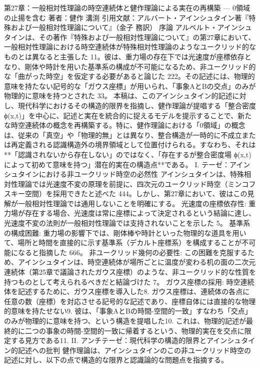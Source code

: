 \documentclass{article}
\begin{document}
第27章：一般相対性理論の時空連続体と健作理論による実在の再構築 — 0領域の止揚を含む
著者：健作 溝渕
引用文献：アルバート・アインシュタイン著『特殊および一般相対性理論について』（金子 務訳）
序論
アルベルト・アインシュタインは、その著作『特殊および一般相対性理論について』の第27章において、一般相対性理論における時空連続体が特殊相対性理論のようなユークリッド的なものとは異なると主張した 11。彼は、重力場の存在下では光速度が座標依存となり、剛体や時計を用いた基準系の構成が不可能になるため、非ユークリッド的な「曲がった時空」を仮定する必要があると論じた 222。その記述には、物理的意味を持たない記号的な「ガウス座標」が用いられ、「事象AとBの交点」のみが物理的に意味を持つとされた 33。
本稿は、このアインシュタイン的記述に対し、現代科学におけるその構造的限界を指摘し、健作理論が提唱する「整合密度 ϕ(x,t)」を中心に、記述と実在を統合的に捉えるモデルを提示することで、新たな時空連続体の概念を再構築する。特に、健作理論における「0領域」の概念は、従来の「真空」や「物理的無」とは異なり、整合構造が一時的に不成立または再定義される認識構造外の境界領域として位置付けられる。すなわち、それは**「認識されないから存在しない」のではなく、「存在するが整合密度場 ϕ(x,t) によって初めて意味を持つ」潜在的実在の構造点**である。
I. テーゼ：アインシュタインにおける非ユークリッド時空の必然性
アインシュタインは、特殊相対性理論では光速度不変の原理を前提に、四次元のユークリッド時空（ミンコフスキー空間）を採用できたと述べた 444。しかし、第27章において、彼はこの見解が一般相対性理論では通用しないことを明確にする。
光速度の座標依存性: 重力場が存在する場合、光速度は常に座標によって決定されるという結論に達し、光速度不変の法則が一般相対性理論では支持されないことを示した 5。
基準系の構成困難: 重力場の影響下では、剛体棒や時計といった物理的な道具を用いて、場所と時間を直接的に示す基準系（デカルト座標系）を構成することが不可能になると指摘した 666。
非ユークリッド幾何の必要性: この困難を克服するため、アインシュタインは、時空連続体が場所ごとに温度が変わる机の面の二次元連続体（第25章で議論されたガウス座標）のような、非ユークリッド的な性質を持つものとして考えられるべきだと結論づけた 7。
ガウス座標の採用: 時空連続体を記述するために、ガウス座標を導入した8. ガウス座標は、連続体の各点に任意の数（座標）を対応させる記号的な記述であり、座標自体には直接的な物理的意味を持たせない9. 彼は、「事象AとBの時間-空間的一致」すなわち「交点」のみが物理的に意味を持つ、という構造を提唱した10. これは、物理的記述が最終的に二つの事象の時間-空間的一致に帰着するという、物理的実在を交点に限定する見方である11.
II. アンチテーゼ：現代科学の構造的限界とアインシュタイン的記述への批判
健作理論は、アインシュタインのこの非ユークリッド時空の記述に対し、以下の点で構造的な限界と認識論的な問題点を指摘する。
\end{document}
